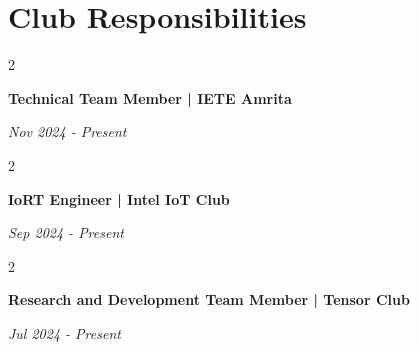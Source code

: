 \documentclass[10pt, letterpaper]{article}
\newenvironment{twocolentry}[2][]{
    \onecolentry
    \def\secondColumn{#2}
    \setcolumnwidth{\fill, 4.5 cm}
    \begin{paracol}{2}
}{
    \switchcolumn \raggedleft \secondColumn
    \end{paracol}
    \endonecolentry
}
\begin{document}
    \section{Club Responsibilities}
        \begin{twocolentry}{
            \textit{Nov 2024 - Present}}
            \textbf{Technical Team Member | IETE Amrita}
        \end{twocolentry}
        
        \vspace{0.2 cm}
        \begin{twocolentry}{
            \textit{Sep 2024 - Present}}
            \textbf{IoRT Engineer | Intel IoT Club}
        \end{twocolentry}
        
        \vspace{0.2 cm}
        \begin{twocolentry}{
            \textit{Jul 2024 - Present}}
            \textbf{Research and Development Team Member | Tensor Club}
        \end{twocolentry}
\end{document}
